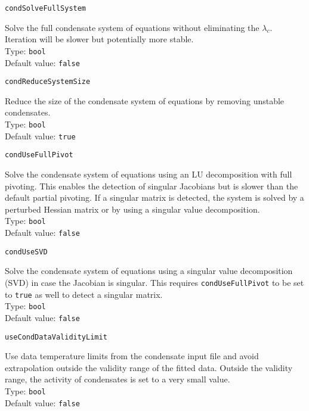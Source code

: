 \documentclass[numbers=noenddot]{aux/fcmanual}
\begin{document}
\lstinline!condSolveFullSystem!
\begin{addmargin}[25pt]{0pt}
	Solve the full condensate system of equations without eliminating the $\lambda_c$. Iteration will be slower but potentially more stable.\\
	Type: \lstinline!bool!\\
	Default value: \lstinline!false!
\end{addmargin}

\lstinline!condReduceSystemSize!
\begin{addmargin}[25pt]{0pt}
	Reduce the size of the condensate system of equations by removing unstable condensates.\\
	Type: \lstinline!bool!\\
	Default value: \lstinline!true!
\end{addmargin}

\lstinline!condUseFullPivot!
\begin{addmargin}[25pt]{0pt}
	Solve the condensate system of equations using an LU decomposition with full pivoting. This enables the detection of singular Jacobians but is slower than the default partial pivoting. If a singular matrix is detected, the system is solved by a perturbed Hessian matrix or by using a singular value decomposition.\\
	Type: \lstinline!bool!\\
	Default value: \lstinline!false!
\end{addmargin}

\lstinline!condUseSVD!
\begin{addmargin}[25pt]{0pt}
	Solve the condensate system of equations using a singular value decomposition (SVD) in case the Jacobian is singular. This requires \lstinline!condUseFullPivot! to be set to \lstinline!true! as well to detect a singular matrix.\\
	Type: \lstinline!bool!\\
	Default value: \lstinline!false!
\end{addmargin}

\lstinline!useCondDataValidityLimit!
\begin{addmargin}[25pt]{0pt}
	Use data temperature limits from the condensate input file and avoid extrapolation outside the validity range of the fitted data. Outside the validity range, the activity of condensates is set to a very small value.\\
	Type: \lstinline!bool!\\
	Default value: \lstinline!false!
\end{addmargin}
\end{document}
